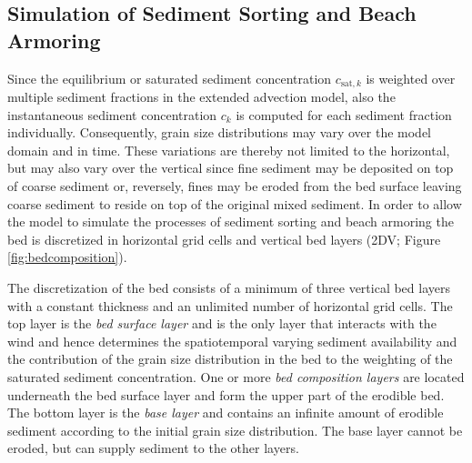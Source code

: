 \subsection{Simulation of Sediment Sorting and Beach Armoring}

Since the equilibrium or saturated sediment concentration
$c_{\mathrm{sat},k}$ is weighted over multiple sediment fractions in
the extended advection model, also the instantaneous sediment
concentration $c_k$ is computed for each sediment fraction
individually. Consequently, grain size distributions may vary over the
model domain and in time. These variations are thereby not limited to
the horizontal, but may also vary over the vertical since fine
sediment may be deposited on top of coarse sediment or, reversely,
fines may be eroded from the bed surface leaving coarse sediment to
reside on top of the original mixed sediment. In order to allow the
model to simulate the processes of sediment sorting and beach armoring
the bed is discretized in horizontal grid cells and vertical bed
layers (2DV; Figure \ref{fig:bedcomposition}).

The discretization of the bed consists of a minimum of three vertical
bed layers with a constant thickness and an unlimited number of
horizontal grid cells. The top layer is the \textit{bed surface layer}
and is the only layer that interacts with the wind and hence
determines the spatiotemporal varying sediment availability and the
contribution of the grain size distribution in the bed to the weighting
of the saturated sediment concentration. One or more \textit{bed
  composition layers} are located underneath the bed surface layer and
form the upper part of the erodible bed. The bottom layer is the
\textit{base layer} and contains an infinite amount of erodible
sediment according to the initial grain size distribution. The base
layer cannot be eroded, but can supply sediment to the other layers.

